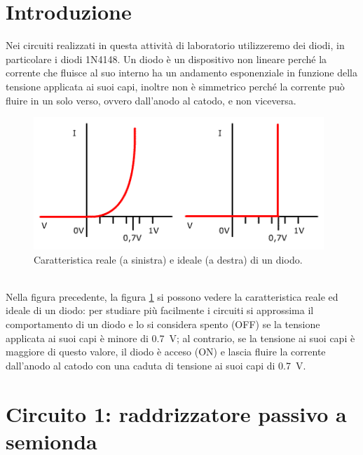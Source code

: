 \documentclass{report}
\begin{document}
\section*{Introduzione}
Nei circuiti realizzati in questa attività di laboratorio utilizzeremo dei diodi, in particolare i diodi 1N4148. Un diodo è un dispositivo non lineare perché la corrente che fluisce al suo interno ha un andamento esponenziale in funzione della tensione applicata ai suoi capi, inoltre non è simmetrico perché la corrente può fluire in un solo verso, ovvero dall'anodo al catodo, e non viceversa.
\begin{figure}[h]
	\centering
	\includegraphics[height=5cm]{immagini/diodo}
	\caption{Caratteristica reale (a sinistra) e ideale (a destra) di un diodo.}
	\label{figura:diodo}
\end{figure}
\\Nella figura precedente, la figura \ref{figura:diodo} si possono vedere la caratteristica reale ed ideale di un diodo: per studiare più facilmente i circuiti si approssima il comportamento di un diodo e lo si considera spento (OFF) se la tensione applicata ai suoi capi è minore di \SI{0.7}{\volt}; al contrario, se la tensione ai suoi capi è maggiore di questo valore, il diodo è acceso (ON) e lascia fluire la corrente dall'anodo al catodo con una caduta di tensione ai suoi capi di \SI{0.7}{\volt}.
\newpage
\section{Circuito 1: raddrizzatore passivo a semionda}
\end{document}
